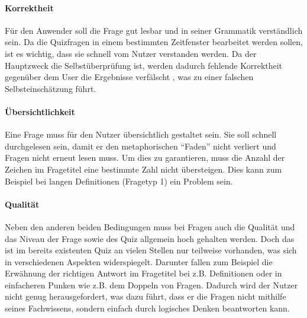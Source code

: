 \documentclass[headsepline,titlepage,ngerman,twoside,12pt]{report}
\begin{document}
\paragraph{Korrektheit}
\label{para:Korrektheit}
Für den Anwender soll die Frage gut lesbar und in seiner Grammatik verständlich sein.
Da die Quizfragen in einem bestimmten Zeitfenster bearbeitet werden sollen, ist es wichtig, dass sie schnell vom Nutzer verstanden werden.
Da der Hauptzweck die Selbstüberprüfung ist, werden dadurch fehlende Korrektheit gegenüber dem User die Ergebnisse verfälscht , was zu einer falschen Selbsteinschätzung führt.
\paragraph{Übersichtlichkeit}
Eine Frage muss für den Nutzer übersichtlich gestaltet sein.
Sie soll schnell durchgelesen sein, damit er den metaphorischen \enquote{Faden} nicht verliert und Fragen nicht erneut lesen muss.
Um dies zu garantieren, muss die Anzahl der Zeichen im Fragetitel eine bestimmte Zahl nicht übersteigen.
Dies kann zum Beispiel bei langen Definitionen (Fragetyp 1) ein Problem sein.
\paragraph{Qualität}
Neben den anderen beiden Bedingungen muss bei Fragen auch die Qualität und das Niveau der Frage sowie des Quiz allgemein hoch gehalten werden.
Doch das ist im bereits existenten Quiz an vielen Stellen nur teilweise vorhanden, was sich in verschiedenen Aspekten widerspiegelt.
Darunter fallen zum Beispiel die Erwähnung der richtigen Antwort im Fragetitel bei z.B. Definitionen oder in einfacheren Punken wie z.B. dem Doppeln von Fragen.
Dadurch wird der Nutzer nicht genug herausgefordert, was dazu führt, dass er die Fragen nicht mithilfe seines Fachwissens, sondern einfach durch logisches Denken beantworten kann.
\end{document}
